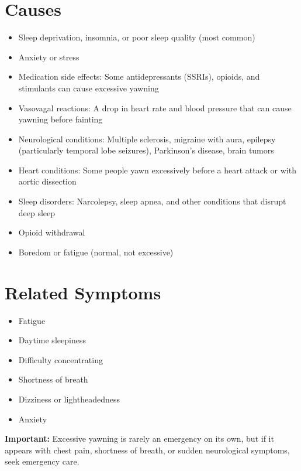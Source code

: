 \section*{Causes}
\begin{itemize}
  \item Sleep deprivation, insomnia, or poor sleep quality (most common)
  \item Anxiety or stress
  \item Medication side effects: Some antidepressants (SSRIs), opioids, and stimulants can cause excessive yawning
  \item Vasovagal reactions: A drop in heart rate and blood pressure that can cause yawning before fainting
  \item Neurological conditions: Multiple sclerosis, migraine with aura, epilepsy (particularly temporal lobe seizures), Parkinson's disease, brain tumors
  \item Heart conditions: Some people yawn excessively before a heart attack or with aortic dissection
  \item Sleep disorders: Narcolepsy, sleep apnea, and other conditions that disrupt deep sleep
  \item Opioid withdrawal
  \item Boredom or fatigue (normal, not excessive)
\end{itemize}

\section*{Related Symptoms}
\begin{itemize}
  \item Fatigue
  \item Daytime sleepiness
  \item Difficulty concentrating
  \item Shortness of breath
  \item Dizziness or lightheadedness
  \item Anxiety
\end{itemize}
\textbf{Important:} Excessive yawning is rarely an emergency on its own, but if it appears with chest pain, shortness of breath, or sudden neurological symptoms, seek emergency care.

